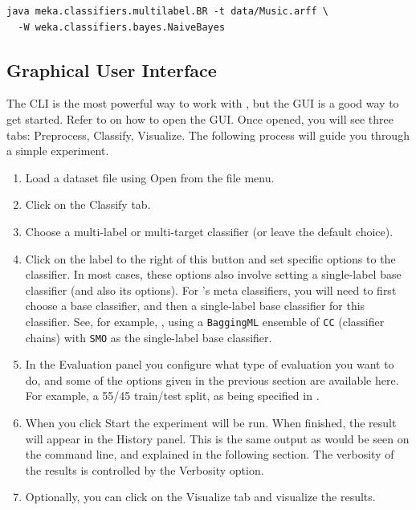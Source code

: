 \documentclass[11pt]{article}
\newcommand{\MEKA}{Meka}
\newcommand{\WEKA}{Weka}
\begin{document}
\begin{lstlisting}
java meka.classifiers.multilabel.BR -t data/Music.arff \
  -W weka.classifiers.bayes.NaiveBayes
\end{lstlisting}

\subsection{Graphical User Interface}

The CLI is the most powerful way to work with \framework{\MEKA}, but the GUI is a good way to get started. Refer to  on how to open the GUI. Once opened, you will see three tabs: \textsf{Preprocess}, \textsf{Classify}, \textsf{Visualize}. The following process will guide you through a simple experiment.




\begin{enumerate}
	\item Load a dataset file using \textsf{Open} from the file menu. %
	\item Click on the \textsf{Classify} tab.
	\item \textsf{Choose} a multi-label or multi-target classifier (or leave the default choice). 
	\item Click on the label to the right of this button and set specific options to the classifier. In most cases, these options also involve setting a \framework{\WEKA} single-label base classifier (and also its options). For \framework{\MEKA}'s meta classifiers, you will need to first choose a \framework{\MEKA} base classifier, and then a single-label \framework{\WEKA} base classifier for this classifier. See, for example, , using a \texttt{BaggingML} ensemble of \texttt{CC} (classifier chains) with \texttt{SMO} as the single-label base classifier.
	\item In the \textsf{Evaluation} panel you configure what type of evaluation you want to do, and some of the options given in the previous section are available here. For example, a 55/45 train/test split, as being specified in \Fig{screen:split}.
	\item When you click \textsf{Start} the experiment will be run. When finished, the result will appear in the \textsf{History} panel. This is the same output as would be seen on the command line, and explained in the following section. The verbosity of the results is controlled by the \textsf{Verbosity} option.
	\item Optionally, you can click on the \textsf{Visualize} tab and visualize the results.
\end{enumerate}
\end{document}
